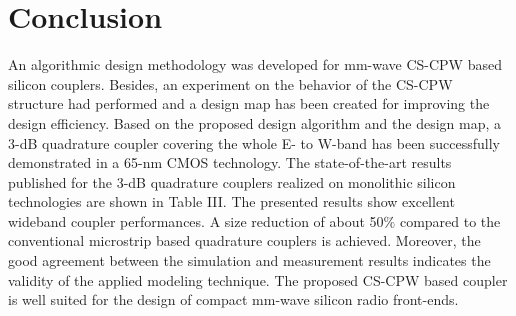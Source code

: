 \documentclass[journal]{IEEEtran}
\begin{document}
\section{Conclusion}
An algorithmic design methodology was developed for mm-wave CS-CPW based silicon couplers. Besides, an experiment on the behavior of the CS-CPW structure had performed and a design map has been created for improving the design efficiency. Based on the proposed design algorithm and the design map, a 3-dB quadrature coupler covering the whole E- to W-band has been successfully demonstrated in a 65-nm CMOS technology. The state-of-the-art results published for the 3-dB quadrature couplers realized on monolithic silicon technologies are shown in Table III. The presented results show excellent wideband coupler performances. A size reduction of about 50$\%$ compared to the conventional microstrip based quadrature couplers is achieved. Moreover, the good
agreement between the simulation and measurement results indicates the validity of the applied modeling technique. The proposed CS-CPW based coupler is well suited for the design of compact mm-wave silicon radio front-ends.







%


\appendices
\end{document}
